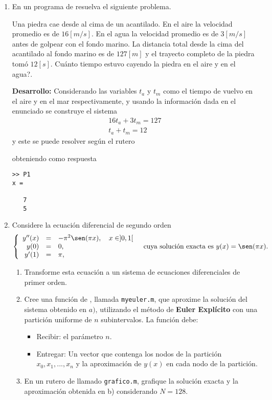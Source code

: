\documentclass[letter,11pt]{article}
\begin{document}
\begin{enumerate}
\item En un programa de \octave resuelva el siguiente problema.

Una piedra cae desde al cima de un acantilado. En el aire la velocidad promedio es de $16[m/s]$. En el agua la velocidad promedio es de $3[m/s]$ antes de golpear con el fondo marino. La distancia total desde la cima del acantilado al fondo marino es de $127[m]$ y el trayecto completo de la piedra tom\'o $12[s]$.
\textquestiondown Cu\'anto tiempo estuvo cayendo la piedra en el aire y en el agua?.

\textbf{Desarrollo:} Considerando las variables $t_a$ y $t_m$ como el tiempo de vuelvo en el aire y en el mar respectivamente, y usando la informaci\'on dada en el enunciado se construye el sistema
$$
\begin{array}{c}
16t_a+3t_m=127\\
t_a+t_m=12
\end{array}
$$
y este se puede resolver seg\'un el rutero

\hfill{}
obteniendo como respuesta
\begin{lstlisting}
>> P1
x =

   7
   5
\end{lstlisting}
\hfill{}

\item Considere la ecuaci\'on diferencial de segundo orden 
\begin{eqnarray*}
\left \{
\begin{array}{rcl}
y''(x)&=& -\pi^2 \sen(\pi x), \quad  x \in ]0,1[\\
y(0)&=&0,\\
y'(1)&=&\pi,\\
\end{array}
\quad \textrm{cuya soluci\'on exacta es $y(x)=\sen(\pi x)$.}\right.
\end{eqnarray*}

\begin{enumerate}
\item Transforme esta ecuaci\'on a un sistema de ecuaciones diferenciales de primer orden.
\item Cree una funci\'on de \octave, llamada \texttt{myeuler.m},  que aproxime la soluci\'on del sistema obtenido en $a)$, utilizando el m\'etodo de {\bf Euler Expl\'icito} con una partici\'on uniforme de $n$ subintervalos. La funci\'on debe:
\begin{itemize}
\item Recibir: el par\'ametro  $n$.
\item Entregar: Un vector que contenga los nodos de la partici\'on $x_0, x_1, ..., x_n$ y la aproximaci\'on de $y(x)$ en cada nodo de la partici\'on.
\end{itemize}
\item  En un rutero de \octave llamado \texttt{grafico.m}, grafique la soluci\'on exacta y la aproximaci\'on obtenida en b) considerando $N=128$. 
\end{enumerate}


\end{enumerate}
\end{document}
